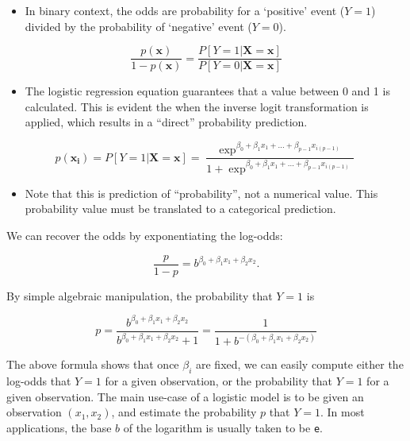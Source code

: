 \documentclass[11pt,dvipsnames,ignorenonframetext,aspectratio=169]{beamer}
\providecommand{\tightlist}{%
  \setlength{\itemsep}{0pt}\setlength{\parskip}{0pt}}
\begin{document}
\begin{frame}{}
\protect\hypertarget{section-3}{}

\begin{itemize}
\tightlist
\item
  In binary context, the odds are probability for a `positive' event
  (\(Y = 1\)) divided by the probability of `negative' event
  (\(Y = 0\)).
\end{itemize}

\[
\frac{p(\mathbf{x})}{1-p(\mathbf{x})} = \frac{P[Y = 1 | \mathbf{X} = \mathbf{x}]}{P[Y = 0 | \mathbf{X} = \mathbf{x}]}
\]

\begin{itemize}
\tightlist
\item
  The logistic regression equation guarantees that a value between 0 and
  1 is calculated. This is evident the when the inverse logit
  transformation is applied, which results in a ``direct'' probability
  prediction.
\end{itemize}

\[
p(\mathbf{x_i}) = P[Y = 1 | \mathbf{X} = \mathbf{x}] = \frac{\exp^{\beta_0 + \beta_1x_1 + ... + \beta_{p-1}x_{i(p-1)}}}{1 + \exp^{\beta_0 + \beta_1x_1 + ... + \beta_{p-1}x_{i(p-1)}}}
\]

\begin{itemize}
\tightlist
\item
  Note that this is prediction of ``probability'', not a numerical
  value. This probability value must be translated to a categorical
  prediction.
\end{itemize}

\end{frame}

\begin{frame}[fragile]{}
\protect\hypertarget{section-4}{}

We can recover the odds by exponentiating the log-odds:

\[
{\displaystyle {\frac {p}{1-p}}=b^{\beta _{0}+\beta _{1}x_{1}+\beta _{2}x_{2}}}.
\]

By simple algebraic manipulation, the probability that
\({\displaystyle Y=1}\) is

\[
{\displaystyle p={\frac {b^{\beta _{0}+\beta _{1}x_{1}+\beta _{2}x_{2}}}{b^{\beta _{0}+\beta _{1}x_{1}+\beta _{2}x_{2}}+1}}={\frac {1}{1+b^{-(\beta _{0}+\beta _{1}x_{1}+\beta _{2}x_{2})}}}}
\]

The above formula shows that once \({\displaystyle \beta _{i}}\) are
fixed, we can easily compute either the log-odds that
\({\displaystyle Y=1}\) for a given observation, or the probability that
\({\displaystyle Y=1}\) for a given observation. The main use-case of a
logistic model is to be given an observation
\({\displaystyle (x_{1},x_{2})}\), and estimate the probability
\({\displaystyle p}\) that \({\displaystyle Y=1}\). In most
applications, the base \({\displaystyle b}\) of the logarithm is usually
taken to be \texttt{e}.

\end{frame}
\end{document}
